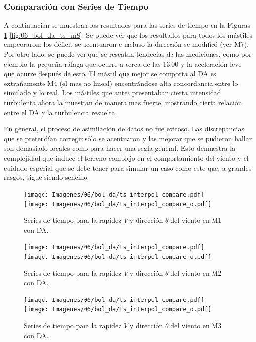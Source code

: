 \subsubsection{Comparación con Series de Tiempo}
A continuación se muestran los resultados para las series de tiempo en la Figuras \ref{fig:06_bol_da_ts_m1}-\ref{fig:06_bol_da_ts_m8}. Se puede ver que los resultados para todos los mástiles empeoraron: los déficit se acentuaron e incluso la dirección se modificó (ver M7). Por otro lado, se puede ver que se rescatan tendecias de las mediciones, como por ejemplo la pequeña ráfaga que ocurre a cerca de las 13:00 y la aceleración leve que ocurre después de esto. El mástil que mejor se comporta al DA es extrañamente M4 (el mas no lineal) encontrándose alta concordancia entre lo simulado y lo real. Los mástiles que antes presentaban cierta intensidad turbulenta ahora la muestran de manera mas fuerte, mostrando cierta relación entre el DA y la turbulencia resuelta.

En general, el proceso de asimilación de datos no fue exitoso. Las discrepancias que se pretendían corregir sólo se acentuaron y las mejorar que se pudieron hallar son demasiado locales como para hacer una regla general. Esto demuestra la complejidad que induce el terreno complejo en el comportamiento del viento y el cuidado especial que se debe tener para simular un caso como este que, a grandes rasgos, sigue siendo sencillo.
\newpage
\begin{figure}[H]
	\centering
	\texttt{[image: Imagenes/06/bol\_da/ts\_interpol\_compare.pdf]}\\%
	\texttt{[image: Imagenes/06/bol\_da/ts\_interpol\_compare\_o.pdf]}%
	\vspace{-2mm}\caption{Series de tiempo para la rapidez $V$ y dirección $\theta$ del viento en M1 con DA.}
	\label{fig:06_bol_da_ts_m1}
\end{figure}

\begin{figure}[H]
	\centering
	\texttt{[image: Imagenes/06/bol\_da/ts\_interpol\_compare.pdf]}\\%
	\texttt{[image: Imagenes/06/bol\_da/ts\_interpol\_compare\_o.pdf]}%
	\vspace{-2mm}\caption{Series de tiempo para la rapidez $V$ y dirección $\theta$ del viento en M2 con DA.}
	\label{fig:06_bol_da_ts_m2}
\end{figure}

\begin{figure}[H]
	\centering
	\texttt{[image: Imagenes/06/bol\_da/ts\_interpol\_compare.pdf]}\\%
	\texttt{[image: Imagenes/06/bol\_da/ts\_interpol\_compare\_o.pdf]}%
	\vspace{-2mm}\caption{Series de tiempo para la rapidez $V$ y dirección $\theta$ del viento en M3 con DA.}
	\label{fig:06_bol_da_ts_m3}
\end{figure}

